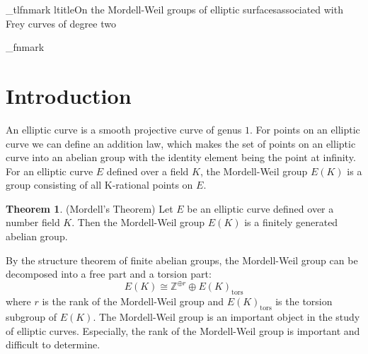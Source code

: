 \documentclass[a4paper]{jarticle} %
\theoremstyle{definition}
\newtheorem{thm}{Theorem}[section]
\theoremstyle{remark}
\begin{document}
%
%
\no_tlfnmark %
%
\2ltitle{On the Mordell-Weil groups of elliptic surfaces}{associated with Frey curves of degree two} %
%
\begin{preliminary}
\end{preliminary}
%
%
%
\init_fnmark %

\section{Introduction}
An elliptic curve is a smooth projective curve of genus $1$.
For points on an elliptic curve we can define an addition law, which makes the set of points on an elliptic curve into an abelian group with the identity element being the point at infinity.
For an elliptic curve $E$ defined over a field $K$, the Mordell-Weil group $E(K)$ is a group consisting of all K-rational points on $E$.

\begin{thm}{(Mordell's Theorem)}
    \label{thm:mordell}
    Let $E$ be an elliptic curve defined over a number field $K$.
    Then the Mordell-Weil group $E(K)$ is a finitely generated abelian group.
\end{thm}
By the structure theorem of finite abelian groups, the Mordell-Weil group can be decomposed into a free part and a torsion part:
\begin{equation*}
    E(K) \cong \mathbb{Z}^{\oplus r} \oplus E(K)_{\text{tors}}
\end{equation*}
where $r$ is the rank of the Mordell-Weil group and $E(K)_{\text{tors}}$ is the torsion subgroup of $E(K)$.
The Mordell-Weil group is an important object in the study of elliptic curves.
Especially, the rank of the Mordell-Weil group is important and difficult to determine.
\end{document}
